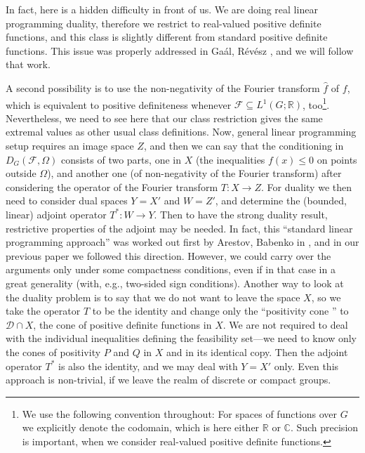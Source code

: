 \documentclass[[a4paper,english,12pt]{amsart}
\theoremstyle{plain}
\theoremstyle{remark}
\newcommand{\ft}[1]{\widehat{#1}}
\newcommand{\DD}{{\mathcal D}}
\newcommand{\FF}{\mathcal{F}}
\newcommand{\RR}{\mathbb R}
\newcommand{\CC}{\mathbb C}
\begin{document}
In fact, here is a hidden difficulty in front of us. We are doing real linear programming duality, therefore we restrict to real-valued positive definite functions, and this class is slightly different from standard positive definite functions. This issue was properly addressed in Ga\'al, R\'ev\'esz \cite{Zeitschrift}, and we will follow that work.

A second possibility is to use the non-negativity of the Fourier transform $\ft{f}$ of $f$, which is equivalent to positive definiteness whenever $\FF \subseteq  L^1(G;\RR)$, too\footnote{We use the following convention throughout: For spaces of functions over $G$ we explicitly denote the codomain, which is here either $\RR$ or $\CC$. Such precision  is important, when we consider real-valued positive definite functions.}. Nevertheless, we need to see here that our class restriction gives the same extremal values as other usual class definitions. Now, general linear programming setup requires an image space $Z$, and then we can say that the conditioning in $D_G(\FF,\Omega)$ consists of two parts, one in $X$ (the inequalities $f(x)\le 0$ on points outside $\Omega$), and another one (of non-negativity of the Fourier transform) after considering the operator of the Fourier transform $T : X \to Z$. For duality we then need to consider dual spaces $Y=X'$ and $W=Z'$, and determine the (bounded, linear) adjoint operator $T^* : W \to Y$. Then to have the strong duality result, restrictive properties of the adjoint may be needed. In fact, this ``standard linear programming approach'' was worked out first by Arestov, Babenko in \cite{AB}, and in our previous paper \cite{UFO} we followed this direction. However, we could carry over the arguments only under some compactness conditions, even if in that case in a great generality (with, e.g.,  two-sided sign conditions). Another way to look at the duality problem is to say that we do not want to leave the space $X$, so we take the operator $T$ to be the identity and change only the ``positivity cone '' to $\DD \cap X$, the cone of positive definite functions in \(X\). We are not required to deal with the individual inequalities defining the feasibility set---we need to know only the cones of positivity $P$ and $Q$ in $X$ and in its identical copy. Then the adjoint operator $T^*$ is also the identity, and we may deal with $Y=X'$ only. Even this approach is non-trivial, if we leave the realm of discrete or compact groups.

\end{document}
